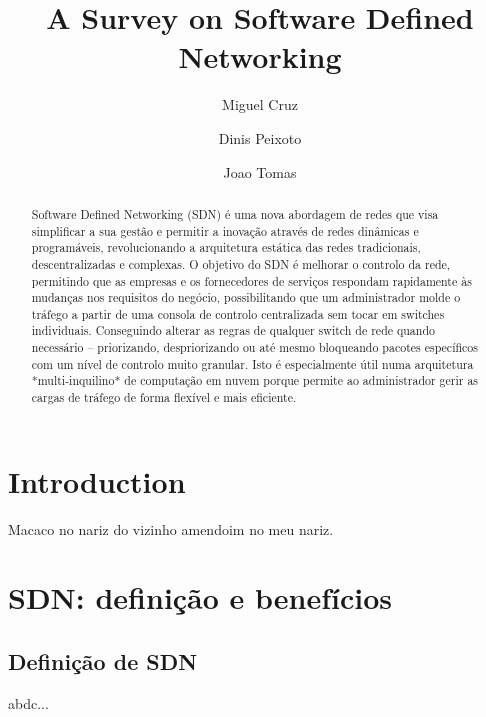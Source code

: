 \documentclass{llncs}
\begin{document}
\mainmatter
\title{A Survey on Software Defined Networking}


\author{Miguel Cruz \and Dinis Peixoto \and Joao Tomas}



\date{}


\maketitle
\begin{abstract}
    Software Defined Networking (SDN) é uma nova abordagem de redes que visa simplificar a sua gestão e permitir a inovação através de redes dinâmicas e programáveis,  revolucionando a arquitetura estática das redes tradicionais, descentralizadas e complexas. 
    O objetivo do SDN é melhorar o controlo da rede, permitindo que as empresas e os fornecedores de serviços respondam rapidamente às mudanças nos requisitos do negócio, possibilitando que um administrador molde o tráfego a partir de uma consola de controlo centralizada sem tocar em switches individuais. Conseguindo alterar as regras de qualquer switch de rede quando necessário – priorizando, despriorizando ou até mesmo bloqueando pacotes específicos com um nível de controlo muito granular.
    Isto é especialmente útil numa arquitetura *multi-inquilino* de computação em nuvem porque permite ao administrador gerir as cargas de tráfego de forma flexível e mais eficiente.
\end{abstract}

\section{Introduction}

Macaco no nariz do vizinho amendoim no meu nariz. \cite{Zadeh65}

\section{SDN: definição e benefícios}

\subsection{Definição de SDN}
abdc...
\end{document}
